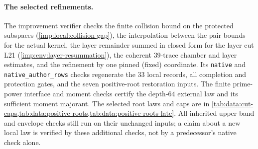 \paragraph{The selected refinements.}
The improvement verifier checks the finite collision bound on
the protected subspaces (\cref{imp:local:collision-gap}), the
interpolation between the pair bounds for the actual kernel,
the layer remainder summed in closed form for the layer cut L21
(\cref{imp:env:layer-resummation}), the coherent $39$-trace
chamber and layer estimates, and the refinement by one pinned
(fixed) coordinate. Its
\texttt{native} and \texttt{native\_author\_rows} checks regenerate the
$33$ local records, all completion and protection gates, and the seven
positive-root restoration inputs. The finite prime-power interface and
moment checks certify the depth-$64$ external law and its sufficient moment
majorant. The selected root laws and caps are in
\cref{tab:data:cut-caps,tab:data:positive-roots,tab:data:positive-roots-late}.
All inherited upper-band and envelope checks still run on their unchanged
inputs; a claim about a new local law is verified by these additional checks,
not by a predecessor's native check alone.

